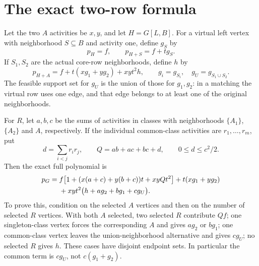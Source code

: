 \documentclass[11pt,a4paper]{article}
\theoremstyle{remark}\newtheorem{remark}[theorem]{Remark}
\begin{document}
\section{The exact two-row formula}\label{mrn:w:rf:sec:tworow}
Let the two $A$ activities be $x,y$, and let $H=G[L,B]$. For a virtual left vertex with neighborhood $S\subseteq B$ and activity one, define $g_S$ by
\[
 p_H=f,\qquad p_{H+S}=f+t g_S.
\]
If $S_1,S_2$ are the actual core-row neighborhoods, define $h$ by
\[
 p_{H+A}=f+t(xg_1+yg_2)+xy t^2h,
 \qquad g_i=g_{S_i},\quad g_U=g_{S_1\cup S_2}.
\]
The feasible support set for $g_U$ is the union of those for $g_1,g_2$: in a matching the virtual row uses one edge, and that edge belongs to at least one of the original neighborhoods.

For $R$, let $a,b,c$ be the sums of activities in classes with neighborhoods $\{A_1\}$, $\{A_2\}$ and $A$, respectively. If the individual common-class activities are $r_1,\ldots,r_m$, put
\[
 d=\sum_{i<j}r_i r_j,\qquad Q=ab+ac+bc+d,
 \qquad 0\le d\le c^2/2.
\]
Then the exact full polynomial is
\begin{align}\label{mrn:w:rf:eq:union}
 p_G={}&f\big[1+(x(a+c)+y(b+c))t+xyQt^2\big]
       +t(xg_1+yg_2)\notag\\
 &+xy t^2\big(h+a g_2+b g_1+c g_U\big).
\end{align}
To prove this, condition on the selected $A$ vertices and then on the number of selected $R$ vertices. With both $A$ selected, two selected $R$ contribute $Qf$; one singleton-class vertex forces the corresponding $A$ and gives $ag_2$ or $bg_1$; one common-class vertex leaves the union-neighborhood alternative and gives $cg_U$; no selected $R$ gives $h$. These cases have disjoint endpoint sets. In particular the common term is $cg_U$, not $c(g_1+g_2)$.

\end{document}

